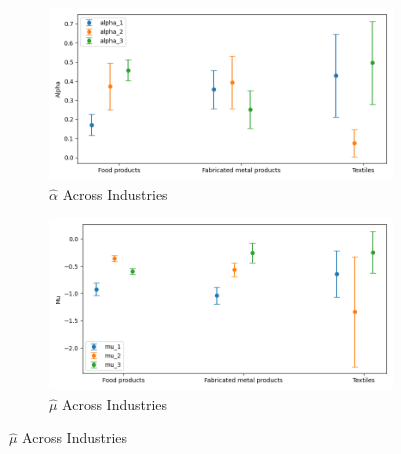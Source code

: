 \documentclass{article}
\begin{document}
\begin{figure}[ht!]
    \centering 
    \caption{I.I.D Normal Model Across Industries}
    \begin{subfigure}[t]{0.32\textwidth}
        \centering
        \includegraphics[width=\textwidth]{figure/stationary_normal_kmshare_ciiu_alpha_across_industries_m3.png}
        \caption{$\hat\alpha$ Across Industries}
    \end{subfigure}
    \begin{subfigure}[t]{0.32\textwidth}
        \centering
        \includegraphics[width=\textwidth]{figure/stationary_normal_kmshare_ciiu_mu_across_industries_m3.png}
        \caption{$\hat\mu$ Across Industries}
    \end{subfigure}
 

\end{figure}
\end{document}
